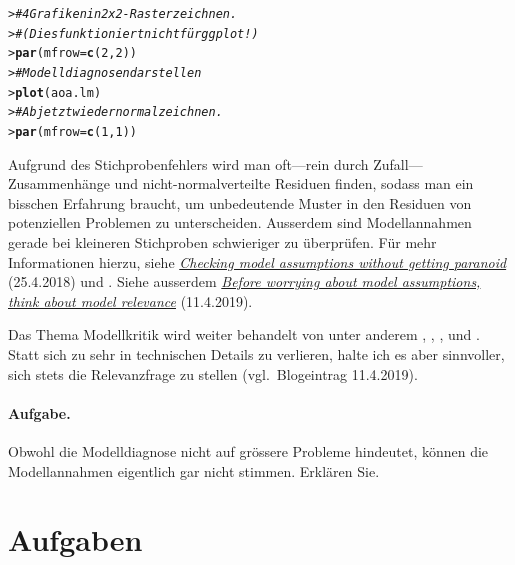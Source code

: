 \documentclass[oneside, 10pt]{book}\usepackage[]{graphicx}\usepackage[]{xcolor}
\makeatletter
\newcommand{\hlnum}[1]{\textcolor[rgb]{0.686,0.059,0.569}{#1}}%
\newcommand{\hlcom}[1]{\textcolor[rgb]{0.678,0.584,0.686}{\textit{#1}}}%
\newcommand{\hlstd}[1]{\textcolor[rgb]{0.345,0.345,0.345}{#1}}%
\newcommand{\hlkwc}[1]{\textcolor[rgb]{0.333,0.667,0.333}{#1}}%
\newcommand{\hlkwd}[1]{\textcolor[rgb]{0.737,0.353,0.396}{\textbf{#1}}}%
\newenvironment{kframe}{%
 \def\at@end@of@kframe{}%
 \ifinner\ifhmode%
  \def\at@end@of@kframe{\end{minipage}}%
  \begin{minipage}{\columnwidth}%
 \fi\fi%
 \def\FrameCommand##1{\hskip\@totalleftmargin \hskip-\fboxsep
 \colorbox{shadecolor}{##1}\hskip-\fboxsep
     \hskip-\linewidth \hskip-\@totalleftmargin \hskip\columnwidth}%
 \MakeFramed {\advance\hsize-\width
   \@totalleftmargin\z@ \linewidth\hsize
   \@setminipage}}%
 {\par\unskip\endMakeFramed%
 \at@end@of@kframe}
\newenvironment{knitrout}{}{} %
\makeatother
\begin{document}
\begin{knitrout}
\color{fgcolor}\begin{kframe}
\begin{alltt}
\hlstd{> }\hlcom{# 4 Grafiken in 2x2-Raster zeichnen.}
\hlstd{> }\hlcom{# (Dies funktioniert nicht für ggplot!)}
\hlstd{> }\hlkwd{par}\hlstd{(}\hlkwc{mfrow} \hlstd{=} \hlkwd{c}\hlstd{(}\hlnum{2}\hlstd{,} \hlnum{2}\hlstd{))}
\hlstd{> }\hlcom{# Modelldiagnosen darstellen}
\hlstd{> }\hlkwd{plot}\hlstd{(aoa.lm)}
\hlstd{> }\hlcom{# Ab jetzt wieder normal zeichnen.}
\hlstd{> }\hlkwd{par}\hlstd{(}\hlkwc{mfrow} \hlstd{=} \hlkwd{c}\hlstd{(}\hlnum{1}\hlstd{,} \hlnum{1}\hlstd{))}
\end{alltt}
\end{kframe}
\end{knitrout}


Aufgrund des Stichprobenfehlers wird man oft---rein durch
Zufall---Zusammenhänge und nicht-normalverteilte Residuen
finden, sodass man ein bisschen Erfahrung braucht, um
unbedeutende Muster in den Residuen von potenziellen
Problemen zu unterscheiden. Ausserdem sind Modellannahmen
gerade bei kleineren Stichproben schwieriger zu überprüfen.
Für mehr Informationen hierzu, siehe \href{https://janhove.github.io/analysis/2018/04/25/graphical-model-checking}{\textit{Checking model assumptions without getting paranoid}} (25.4.2018)
und \citet{Vanhove2018b}.
Siehe ausserdem
\href{https://janhove.github.io/analysis/2019/04/11/assumptions-relevance}{\textit{Before worrying about model assumptions, think about model relevance}} (11.4.2019).

Das Thema Modellkritik wird weiter behandelt von
unter anderem
\citet{Baayen2008},
\citet[][Kapitel 4]{Cohen2003},
\citet[][Kapitel 4]{Faraway2005},
\citet[][Kapitel 8--9]{Weisberg2005} und
\citet[][Kapitel 2]{Zuur2009}.
Statt sich zu sehr in technischen Details zu verlieren,
halte ich es aber sinnvoller, sich stets die Relevanzfrage
zu stellen (vgl.\ Blogeintrag 11.4.2019).

\paragraph{Aufgabe.} Obwohl die Modelldiagnose
nicht auf grössere Probleme hindeutet, können
die Modellannahmen eigentlich gar nicht stimmen.
Erklären Sie.

\section{Aufgaben}
\end{document}
